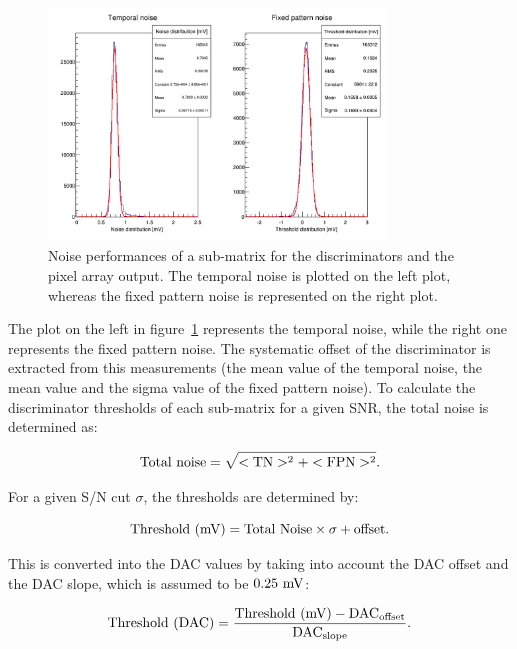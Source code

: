   \begin{figure}[!h]
    \centering
    \includegraphics[width=0.8\textwidth]{Pictures/labTests/noise_A.png}
    \caption{Noise performances of a sub-matrix for the discriminators and the pixel array output. The temporal noise is plotted on the left plot, whereas the fixed pattern noise is represented on the right plot.} 
    \label{fig:TN&FPN}
  \end{figure}

  The plot on the left in figure~\ref{fig:TN&FPN} represents the temporal noise, while the right one represents the fixed pattern noise.
  The systematic offset of the discriminator is extracted from this measurements (the mean value of the temporal noise, the mean value and the sigma value of the fixed pattern noise).
  To calculate the discriminator thresholds of each sub-matrix for a given \gls{SNR}, the total noise is determined as:
  
  \begin{equation}
    \rm{Total~noise} = \sqrt{<\rm{TN}>^2 + <\rm{FPN}>^2}.
  \end{equation}

  For a given S/N cut $\sigma$, the thresholds are determined by:

  \begin{equation}
    \rm{Threshold~(mV)} = \rm{Total~Noise} \times \sigma + \rm{offset}.
  \end{equation}

  This is converted into the \gls{DAC} values by taking into account the \gls{DAC} offset and the \gls{DAC} slope, which is assumed to be $0.25~\rm{mV}$:
  
  \begin{equation}
    \rm{Threshold~(DAC)} = \frac{\rm{Threshold~(mV)} - \rm{DAC}_{\rm{offset}}}{\rm{DAC}_{\rm{slope}}}.
  \end{equation}

